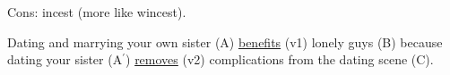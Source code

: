 \documentclass[12pt]{article}
\begin{document}
Cons: incest (more like wincest).

Dating and marrying your own sister (A) \uline{benefits} (v1) lonely guys (B) because dating your sister (A$^\prime$) \uline{removes} (v2) complications from the dating scene (C).

\end{document}
